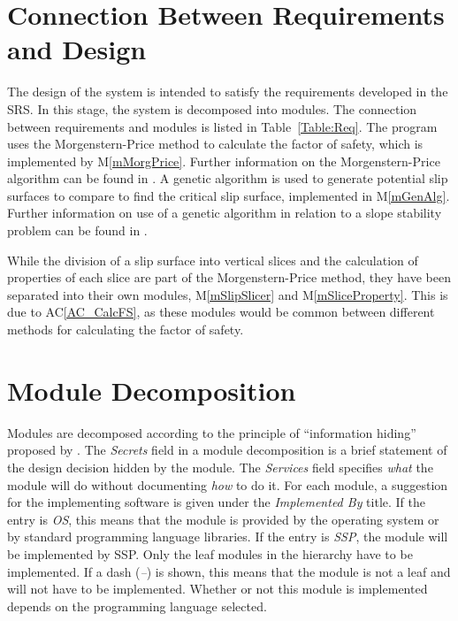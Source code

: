 \documentclass[12pt, titlepage]{article}
\newcommand{\progname}{SSP}
\newcommand{\acref}[1]{AC\ref{#1}}
\newcommand{\mref}[1]{M\ref{#1}}
\begin{document}
\section{Connection Between Requirements and Design} \label{SecConnection}


The design of the system is intended to satisfy the
requirements developed in the SRS. In this stage, the system is
decomposed into modules. The connection between requirements and
modules is listed in Table~\ref{Table:Req}. The program uses the 
Morgenstern-Price method to calculate the factor of safety, which is implemented
by \mref{mMorgPrice}. Further information on the Morgenstern-Price algorithm 
can be found in \cite{ZhuEtAl2005}. A genetic algorithm is used to generate 
potential slip surfaces to compare to find the critical slip surface, 
implemented in \mref{mGenAlg}. Further information on use of a genetic 
algorithm in relation to a slope stability problem can be found in 
\cite{LiEtAl}.

While the division of a slip surface into vertical slices and the calculation 
of properties of each slice are part of the Morgenstern-Price method, they have 
been separated into their own modules, \mref{mSlipSlicer} and 
\mref{mSliceProperty}. This is due to \acref{AC_CalcFS}, as these modules would 
be common between different methods for calculating the factor of safety.

\section{Module Decomposition} \label{SecMD}

\hspace{3ex}Modules are decomposed according to the principle of
``information hiding'' proposed by \citet{ParnasEtAl1984}. The
\emph{Secrets} field in a module decomposition is a brief statement of
the design decision hidden by the module. The \emph{Services} field
specifies \emph{what} the module will do without documenting
\emph{how} to do it. For each module, a suggestion for the
implementing software is given under the \emph{Implemented By}
title. If the entry is \emph{OS}, this means that the module is
provided by the operating system or by standard programming language
libraries. If the entry is \emph{\progname}, the module will be implemented by 
\progname. Only the leaf modules in the hierarchy have to be implemented. If a 
dash (\emph{--}) is shown, this means that the module is not a leaf and will 
not have to be implemented. Whether or not this module is implemented depends 
on the programming language selected.
\end{document}
